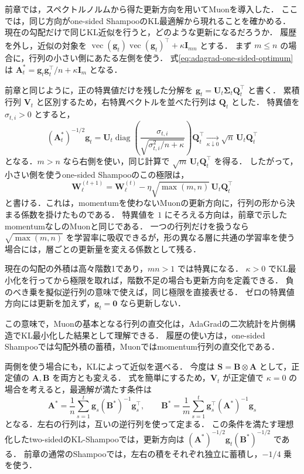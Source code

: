 \documentclass[../main.tex]{subfiles}
\begin{document}
前章では，スペクトルノルムから得た更新方向を用いてMuonを導入した．
ここでは，同じ方向がone-sided ShampooのKL最適解から現れることを確かめる．
現在の勾配だけで同じKL近似を行うと，どのような更新になるだろうか．
履歴を外し，近似の対象を
$\operatorname{vec}(\bm{g}_t)\operatorname{vec}(\bm{g}_t)^\top+\kappa\bm{I}_{mn}$ とする．
まず $m\leq n$ の場合に，行列の小さい側にあたる左側を使う．
式\eqref{eq:adagrad-one-sided-optimum}は
$\bm{A}_t^*=\bm{g}_t\bm{g}_t^\top/n+\kappa\bm{I}_m$ となる．

前章と同じように，正の特異値だけを残した分解を
$\bm{g}_t=\bm{U}_t\bm{\Sigma}_t\bm{Q}_t^\top$ と書く．
累積行列 $\bm{V}_t$ と区別するため，右特異ベクトルを並べた行列は $\bm{Q}_t$ とした．
特異値を $\sigma_{t,i}>0$ とすると，
\begin{equation}
  (\bm{A}_t^*)^{-1/2}\bm{g}_t
  =\bm{U}_t\operatorname{diag}\!\left(
  \frac{\sigma_{t,i}}{\sqrt{\sigma_{t,i}^2/n+\kappa}}\right)\bm{Q}_t^\top
  \xrightarrow[\kappa\downarrow0]{}\sqrt{n}\,\bm{U}_t\bm{Q}_t^\top
  \label{eq:adagrad-muon-limit}
\end{equation}
となる．$m>n$ なら右側を使い，同じ計算で $\sqrt{m}\,\bm{U}_t\bm{Q}_t^\top$ を得る．
したがって，小さい側を使うone-sided Shampooのこの極限は，
\begin{equation}
  \bm{W}_\ell^{(t+1)}
  =\bm{W}_\ell^{(t)}-\eta\sqrt{\max(m,n)}\,
  \bm{U}_t\bm{Q}_t^\top
  \label{eq:adagrad-scaled-muon}
\end{equation}
と書ける．これは，momentumを使わないMuonの更新方向に，行列の形から決まる係数を掛けたものである．
特異値を $1$ にそろえる方向は，前章で示したmomentumなしのMuonと同じである．
一つの行列だけを扱うなら $\sqrt{\max(m,n)}$ を学習率に吸収できるが，形の異なる層に共通の学習率を使う場合には，層ごとの更新量を変える係数として残る．

現在の勾配の外積は高々階数1であり，$mn>1$ では特異になる．
$\kappa>0$ でKL最小化を行ってから極限を取れば，階数不足の場合も更新方向を定義できる．
負のべき乗を擬似逆行列の意味で使えば，同じ極限を直接表せる．
ゼロの特異値方向には更新を加えず，$\bm{g}_t=\bm{0}$ なら更新しない．

この意味で，Muonの基本となる行列の直交化は，AdaGradの二次統計を片側構造でKL最小化した結果として理解できる．
履歴の使い方は，one-sided Shampooでは勾配外積の蓄積，Muonではmomentum行列の直交化である．

両側を使う場合にも，KLによって近似を選べる．
今度は $\bm{S}=\bm{B}\otimes\bm{A}$ として，正定値の $\bm{A},\bm{B}$ を両方とも変える．
式を簡単にするため，$\bm{V}_t$ が正定値で $\kappa=0$ の場合を考えると，最適解が満たす条件は
\begin{equation}
  \bm{A}^*=\frac1n\sum_{s=1}^t
  \bm{g}_s(\bm{B}^*)^{-1}\bm{g}_s^\top,
  \qquad
  \bm{B}^*=\frac1m\sum_{s=1}^t
  \bm{g}_s^\top(\bm{A}^*)^{-1}\bm{g}_s
  \label{eq:adagrad-two-sided-kl}
\end{equation}
となる．左右の行列は，互いの逆行列を使って定まる．
この条件を満たす理想化したtwo-sidedのKL-Shampooでは，更新方向は
$(\bm{A}^*)^{-1/2}\bm{g}_t(\bm{B}^*)^{-1/2}$ である．
前章の通常のShampooでは，左右の積をそれぞれ独立に蓄積し，$-1/4$ 乗を使う．
\end{document}
